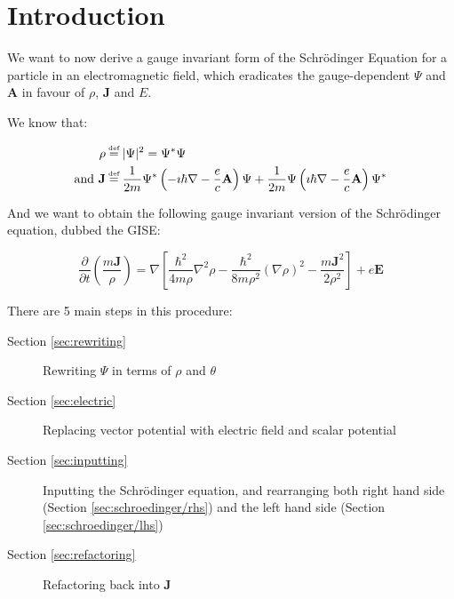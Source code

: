 
\section{Introduction}

We want to now derive a gauge invariant form of the Schr\"odinger Equation for a
particle in an electromagnetic field, which eradicates the gauge-dependent
$\Psi$ and $\mathbf{A}$ in favour of $\rho$, $\mathbf{J}$ and $E$.

We know that:

\begin{align}
    \rho &\defeq |\Psi|^2 = \Psi^* \Psi \\
    \mathrm{and} ~ \mathbf{J} &\defeq \frac{1}{2m} \Psi^*\left( - \imath \hbar \nabla -
    \frac{e}{c} \mathbf{A} \right) \Psi + \frac{1}{2m}\Psi\left(\imath \hbar
    \nabla - \frac{e}{c} \mathbf{A} \right) \Psi^*
\end{align}

And we want to obtain the following gauge invariant version of the Schr\"odinger
equation, dubbed the GISE:

\begin{equation}
    \frac{\partial}{\partial t} \left( \frac{m \mathbf{J}}{\rho} \right) =
    \nabla \left[ \frac{\hbar^2}{4m \rho} \nabla^2 \rho - \frac{\hbar^2}{8m
        \rho^2} \left( \nabla \rho \right)^2 - \frac{m \mathbf{J}^2}{2 \rho^2}
    \right] + e \mathbf{E}
    \label{eqn:gise}
\end{equation}

There are 5 main steps in this procedure:

\begin{description}
    \item[Section \ref{sec:rewriting}]{Rewriting $\Psi$ in terms of $\rho$ and $\theta$}
    \item[Section \ref{sec:electric}]{Replacing vector potential with electric
        field and scalar potential}
    \item[Section \ref{sec:inputting}]{Inputting the Schr\"odinger equation, and
        rearranging both right hand side (Section \ref{sec:schroedinger/rhs}) and
        the left hand side (Section \ref{sec:schroedinger/lhs})}
    \item[Section \ref{sec:refactoring}]{Refactoring back into $\mathbf{J}$}
\end{description}
